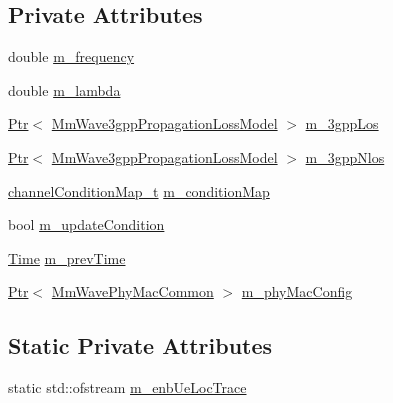 \subsection*{Private Attributes}
\begin{DoxyCompactItemize}
\item 
double \hyperlink{classns3_1_1MmWave3gppBuildingsPropagationLossModel_ad7de82f89dfd910f127ce775fec14898}{m\+\_\+frequency}
\item 
double \hyperlink{classns3_1_1MmWave3gppBuildingsPropagationLossModel_a5a31886cebbfec96eb707ffa60c9b0e3}{m\+\_\+lambda}
\item 
\hyperlink{classns3_1_1Ptr}{Ptr}$<$ \hyperlink{classMmWave3gppPropagationLossModel}{Mm\+Wave3gpp\+Propagation\+Loss\+Model} $>$ \hyperlink{classns3_1_1MmWave3gppBuildingsPropagationLossModel_a301f6c6643f00646ce16bd114ad22389}{m\+\_\+3gpp\+Los}
\item 
\hyperlink{classns3_1_1Ptr}{Ptr}$<$ \hyperlink{classMmWave3gppPropagationLossModel}{Mm\+Wave3gpp\+Propagation\+Loss\+Model} $>$ \hyperlink{classns3_1_1MmWave3gppBuildingsPropagationLossModel_a18ac2d667b12fa593c0ea044ad05af82}{m\+\_\+3gpp\+Nlos}
\item 
\hyperlink{mmwave-3gpp-propagation-loss-model_8h_a76b21036afebb8764ee4bfe0aa80e806}{channel\+Condition\+Map\+\_\+t} \hyperlink{classns3_1_1MmWave3gppBuildingsPropagationLossModel_a18b00c0130a2924ec13a7885543fc569}{m\+\_\+condition\+Map}
\item 
bool \hyperlink{classns3_1_1MmWave3gppBuildingsPropagationLossModel_a2011a4d9cee62e274925719f9a9f4728}{m\+\_\+update\+Condition}
\item 
\hyperlink{classns3_1_1Time}{Time} \hyperlink{classns3_1_1MmWave3gppBuildingsPropagationLossModel_a08f254d1073c8254d595810f8580a7e7}{m\+\_\+prev\+Time}
\item 
\hyperlink{classns3_1_1Ptr}{Ptr}$<$ \hyperlink{classns3_1_1MmWavePhyMacCommon}{Mm\+Wave\+Phy\+Mac\+Common} $>$ \hyperlink{classns3_1_1MmWave3gppBuildingsPropagationLossModel_ad566c0ae6da1d14cdab3ff583af09ec7}{m\+\_\+phy\+Mac\+Config}
\end{DoxyCompactItemize}
\subsection*{Static Private Attributes}
\begin{DoxyCompactItemize}
\item 
static std\+::ofstream \hyperlink{classns3_1_1MmWave3gppBuildingsPropagationLossModel_a997b4c63a3c00dd6f0cf7148cbffad11}{m\+\_\+enb\+Ue\+Loc\+Trace}
\end{DoxyCompactItemize}
